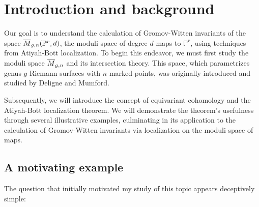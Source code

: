 \documentclass[12pt]{memoir}
\author{\nauthor}
\begin{document}

\tableofcontents

\chapter{Introduction and background}

Our goal is to understand the calculation of Gromov-Witten invariants of the space $\overline{M}_{g,n}(\mathbb{P}^r,d)$, the moduli space of degree $d$ maps to $\mathbb{P}^r$, using techniques from Atiyah-Bott localization. To begin this endeavor, we must first study the moduli space $\overline{M}_{g,n}$ and its intersection theory. This space, which parametrizes genus $g$ Riemann surfaces with $n$ marked points, was originally introduced and studied by Deligne and Mumford.

Subsequently, we will introduce the concept of equivariant cohomology and the Atiyah-Bott localization theorem. We will demonstrate the theorem's usefulness through several illustrative examples, culminating in its application to the calculation of Gromov-Witten invariants via localization on the moduli space of maps.

\section{A motivating example}

The question that initially motivated my study of this topic appears deceptively simple:
\end{document}
